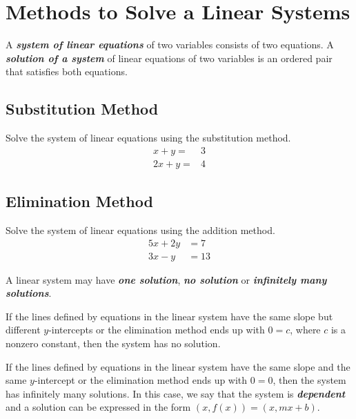 
\section{Methods to Solve a Linear
Systems}

A \textbf{\emph{system of linear equations}} of two variables consists
of two equations. A \textbf{\emph{solution of a system}} of linear
equations of two variables is an ordered pair that satisfies both
equations.

\hypertarget{substitution-method}{%
\subsection{Substitution Method}\label{substitution-method}}

\begin{example}

Solve the system of linear equations using the substitution method. \[
\begin{aligned}
    x + y =  & 3  \label{ex-1-1}\\
    2x + y = & 4
\end{aligned}
\]

\end{example}
\vspace*{6\baselineskip}

\hypertarget{elimination-method}{%
\subsection{Elimination Method}\label{elimination-method}}

\begin{example}

Solve the system of linear equations using the addition method. \[
\begin{aligned}
5x + 2y & = 7  \label{ex-2-1} \\
3x - y  & = 13
\end{aligned}
\]

\end{example}
\vspace*{6\baselineskip}

\begin{remark}

A linear system may have \textbf{\emph{one solution}}, \textbf{\emph{no
solution}} or \textbf{\emph{infinitely many solutions}}.

If the lines defined by equations in the linear system have the same
slope but different \(y\)-intercepts or the elimination method ends up
with \(0=c\), where \(c\) is a nonzero constant, then the system has no
solution.

If the lines defined by equations in the linear system have the same
slope and the same \(y\)-intercept or the elimination method ends up
with \(0=0\), then the system has infinitely many solutions. In this
case, we say that the system is \textbf{\emph{dependent}} and a solution
can be expressed in the form \((x, f(x))=(x, mx+b)\).

\end{remark}

